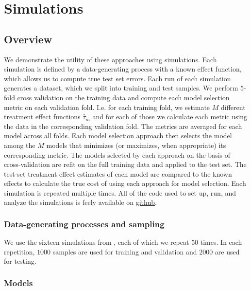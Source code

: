 \section{Simulations}
\label{simulations}

\subsection{Overview}

We demonstrate the utility of these approaches using simulations. Each simulation is defined by a data-generating process with a known effect function, which allows us to compute true test set errors. Each run of each simulation generates a dataset, which we split into training and test samples. We perform $5$-fold cross validation on the training data and compute each model selection metric on each validation fold. I.e. for each training fold, we estimate $M$ different treatment effect functions $\hat\tau_m$ and for each of those we calculate each metric using the data in the corresponding validation fold. The metrics are averaged for each model across all folds. Each model selection approach then selects the model among the $M$ models that minimizes (or maximizes, when appropriate) its corresponding metric. The models selected by each approach on the basis of cross-validation are refit on the full training data and applied to the test set. The test-set treatment effect estimates of each model are compared to the known effects to calculate the true cost of using each approach for model selection. Each simulation is repeated multiple times. All of the code used to set up, run, and analyze the simulations is feely available on \href{https://github.com/som-shahlab/ITE-model-selection}{github}.

\subsubsection{Data-generating processes and sampling}

We use the sixteen simulations from \citet{Powers:2017wd}, each of which we repeat $50$ times. In each repetition, $1000$ samples are used for training and validation and $2000$ are used for testing. 

\subsubsection{Models}

